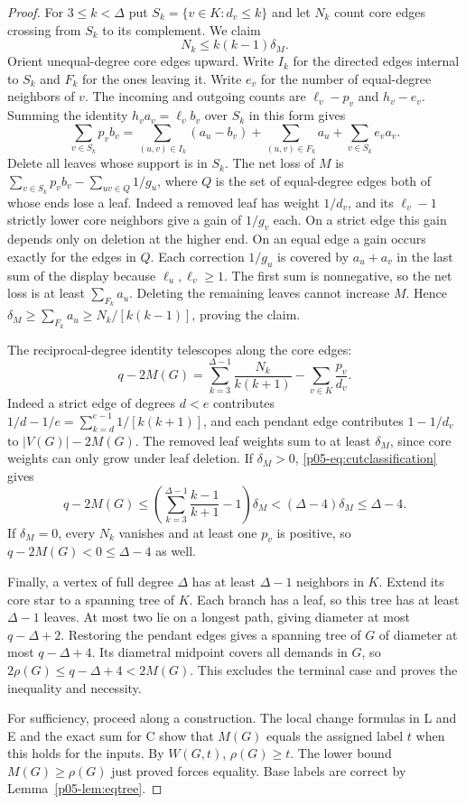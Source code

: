 \documentclass[11pt,a4paper]{article}
\begin{document}
\begin{proof}
For $3\le k<\Delta$ put $S_k=\{v\in K:d_v\le k\}$ and let $N_k$ count
core edges crossing from $S_k$ to its complement. We claim
\begin{equation}\label{p05-eq:cutclassification}
 N_k\le k(k-1)\delta_M .
\end{equation}
Orient unequal-degree core edges upward. Write $I_k$ for the directed
edges internal to $S_k$ and $F_k$ for the ones leaving it. Write $e_v$
for the number of equal-degree neighbors of $v$. The incoming and
outgoing counts are $\ell_v-p_v$ and $h_v-e_v$. Summing the identity
$h_va_v=\ell_vb_v$ over $S_k$ in this form gives
\[
 \sum_{v\in S_k}p_v b_v
 =\sum_{(u,v)\in I_k}(a_u-b_v)
    +\sum_{(u,v)\in F_k}a_u+\sum_{v\in S_k}e_v a_v .
\]
Delete all leaves whose support is in $S_k$. The net loss of $M$ is
$\sum_{v\in S_k}p_vb_v-\sum_{uv\in Q}1/g_u$, where $Q$ is the set of
equal-degree edges both of whose ends lose a leaf. Indeed a removed
leaf has weight $1/d_v$, and its $\ell_v-1$ strictly lower core neighbors
give a gain of $1/g_v$ each. On a strict edge this gain depends only on
deletion at the higher end. On an equal edge a gain occurs exactly for
the edges in $Q$. Each correction $1/g_u$ is covered by $a_u+a_v$ in
the last sum of the display because $\ell_u,\ell_v\ge1$. The first sum
is nonnegative, so the net loss is at least $\sum_{F_k}a_u$. Deleting
the remaining leaves cannot increase $M$. Hence
$\delta_M\ge\sum_{F_k}a_u\ge N_k/[k(k-1)]$, proving the claim.

The reciprocal-degree identity telescopes along the core edges:
\[
 q-2M(G)=\sum_{k=3}^{\Delta-1}\frac{N_k}{k(k+1)}
                 -\sum_{v\in K}\frac{p_v}{d_v}.
\]
Indeed a strict edge of degrees $d<e$ contributes
$1/d-1/e=\sum_{k=d}^{e-1}1/[k(k+1)]$, and each pendant edge contributes
$1-1/d_v$ to $|V(G)|-2M(G)$. The removed leaf weights sum to at least
$\delta_M$, since core weights can only grow under leaf deletion. If
$\delta_M>0$, \eqref{p05-eq:cutclassification} gives
\[
 q-2M(G)\le
 \left(\sum_{k=3}^{\Delta-1}\frac{k-1}{k+1}-1\right)\delta_M
 <(\Delta-4)\delta_M\le\Delta-4 .
\]
If $\delta_M=0$, every $N_k$ vanishes and at least one $p_v$ is positive,
so $q-2M(G)<0\le\Delta-4$ as well.

Finally, a vertex of full degree $\Delta$ has at least $\Delta-1$
neighbors in $K$. Extend its core star to a spanning tree of $K$. Each
branch has a leaf, so this tree has at least $\Delta-1$ leaves. At most
two lie on a longest path, giving diameter at most $q-\Delta+2$.
Restoring the pendant edges gives a spanning tree of $G$ of diameter
at most $q-\Delta+4$. Its diametral midpoint covers all demands in $G$,
so $2\rho(G)\le q-\Delta+4<2M(G)$. This excludes the terminal case
and proves the inequality and necessity.

For sufficiency, proceed along a construction. The local change formulas
in L and E and the exact sum for C show that $M(G)$ equals the assigned
label $t$ when this holds for the inputs. By $W(G,t)$, $\rho(G)\ge t$.
The lower bound $M(G)\ge\rho(G)$ just proved forces equality. Base labels
are correct by Lemma~\ref{p05-lem:eqtree}.
\end{proof}
\end{document}
